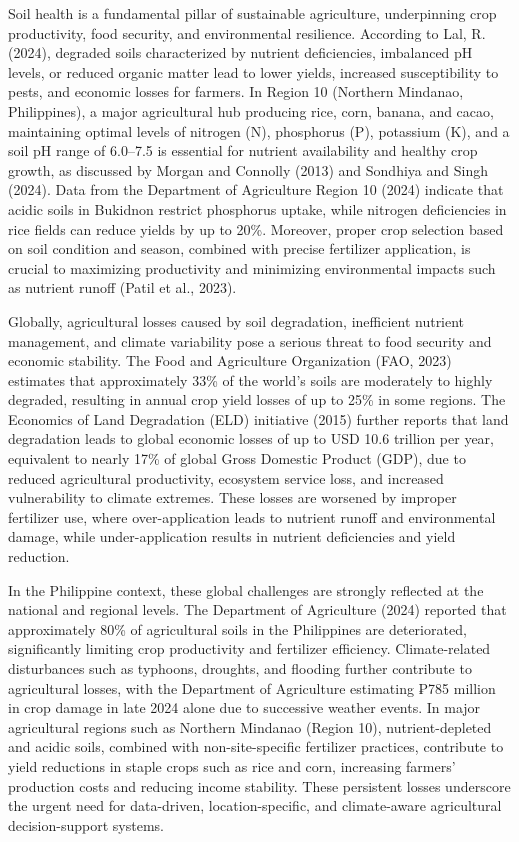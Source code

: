 {	Soil health is a fundamental pillar of sustainable agriculture, underpinning crop productivity, food security, and environmental resilience. According to Lal, R. (2024), degraded soils characterized by nutrient deficiencies, imbalanced pH levels, or reduced organic matter lead to lower yields, increased susceptibility to pests, and economic losses for farmers. In Region 10 (Northern Mindanao, Philippines), a major agricultural hub producing rice, corn, banana, and cacao, maintaining optimal levels of nitrogen (N), phosphorus (P), potassium (K), and a soil pH range of 6.0–7.5 is essential for nutrient availability and healthy crop growth, as discussed by Morgan and Connolly (2013) and Sondhiya and Singh (2024). Data from the Department of Agriculture Region 10 (2024) indicate that acidic soils in Bukidnon restrict phosphorus uptake, while nitrogen deficiencies in rice fields can reduce yields by up to 20\%. Moreover, proper crop selection based on soil condition and season, combined with precise fertilizer application, is crucial to maximizing productivity and minimizing environmental impacts such as nutrient runoff (Patil et al., 2023).
	
	Globally, agricultural losses caused by soil degradation, inefficient nutrient management, and climate variability pose a serious threat to food security and economic stability. The Food and Agriculture Organization (FAO, 2023) estimates that approximately 33\% of the world’s soils are moderately to highly degraded, resulting in annual crop yield losses of up to 25\% in some regions. The Economics of Land Degradation (ELD) initiative (2015) further reports that land degradation leads to global economic losses of up to USD 10.6 trillion per year, equivalent to nearly 17\% of global Gross Domestic Product (GDP), due to reduced agricultural productivity, ecosystem service loss, and increased vulnerability to climate extremes. These losses are worsened by improper fertilizer use, where over-application leads to nutrient runoff and environmental damage, while under-application results in nutrient deficiencies and yield reduction.
	
	In the Philippine context, these global challenges are strongly reflected at the national and regional levels. The Department of Agriculture (2024) reported that approximately 80\% of agricultural soils in the Philippines are deteriorated, significantly limiting crop productivity and fertilizer efficiency. Climate-related disturbances such as typhoons, droughts, and flooding further contribute to agricultural losses, with the Department of Agriculture estimating ₱785 million in crop damage in late 2024 alone due to successive weather events. In major agricultural regions such as Northern Mindanao (Region 10), nutrient-depleted and acidic soils, combined with non-site-specific fertilizer practices, contribute to yield reductions in staple crops such as rice and corn, increasing farmers’ production costs and reducing income stability. These persistent losses underscore the urgent need for data-driven, location-specific, and climate-aware agricultural decision-support systems.
	
}
